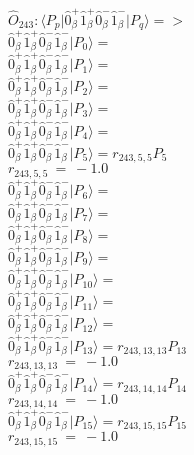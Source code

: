 \documentclass[14pt]{article}
\begin{document}
    $\hat{O}_{243}:  \langle{P_p}\vert \hat{0}_{\beta}^{+}\hat{1}_{\beta}^{+}\hat{0}_{\beta}^{-}\hat{1}_{\beta}^{-} \vert{P_q}\rangle => $ \\ 
    $ \hat{0}_{\beta}^{+}\hat{1}_{\beta}^{+}\hat{0}_{\beta}^{-}\hat{1}_{\beta}^{-} \vert{P_{0}}\rangle =  $ \\ 
    $ \hat{0}_{\beta}^{+}\hat{1}_{\beta}^{+}\hat{0}_{\beta}^{-}\hat{1}_{\beta}^{-} \vert{P_{1}}\rangle =  $ \\ 
    $ \hat{0}_{\beta}^{+}\hat{1}_{\beta}^{+}\hat{0}_{\beta}^{-}\hat{1}_{\beta}^{-} \vert{P_{2}}\rangle =  $ \\ 
    $ \hat{0}_{\beta}^{+}\hat{1}_{\beta}^{+}\hat{0}_{\beta}^{-}\hat{1}_{\beta}^{-} \vert{P_{3}}\rangle =  $ \\ 
    $ \hat{0}_{\beta}^{+}\hat{1}_{\beta}^{+}\hat{0}_{\beta}^{-}\hat{1}_{\beta}^{-} \vert{P_{4}}\rangle =  $ \\ 
    $ \hat{0}_{\beta}^{+}\hat{1}_{\beta}^{+}\hat{0}_{\beta}^{-}\hat{1}_{\beta}^{-} \vert{P_{5}}\rangle = {r}_{243,5,5}P_{5} $ \\ 
    ${r}_{243,5,5}\ =\ -1.0 $ \\ 
    $ \hat{0}_{\beta}^{+}\hat{1}_{\beta}^{+}\hat{0}_{\beta}^{-}\hat{1}_{\beta}^{-} \vert{P_{6}}\rangle =  $ \\ 
    $ \hat{0}_{\beta}^{+}\hat{1}_{\beta}^{+}\hat{0}_{\beta}^{-}\hat{1}_{\beta}^{-} \vert{P_{7}}\rangle =  $ \\ 
    $ \hat{0}_{\beta}^{+}\hat{1}_{\beta}^{+}\hat{0}_{\beta}^{-}\hat{1}_{\beta}^{-} \vert{P_{8}}\rangle =  $ \\ 
    $ \hat{0}_{\beta}^{+}\hat{1}_{\beta}^{+}\hat{0}_{\beta}^{-}\hat{1}_{\beta}^{-} \vert{P_{9}}\rangle =  $ \\ 
    $ \hat{0}_{\beta}^{+}\hat{1}_{\beta}^{+}\hat{0}_{\beta}^{-}\hat{1}_{\beta}^{-} \vert{P_{10}}\rangle =  $ \\ 
    $ \hat{0}_{\beta}^{+}\hat{1}_{\beta}^{+}\hat{0}_{\beta}^{-}\hat{1}_{\beta}^{-} \vert{P_{11}}\rangle =  $ \\ 
    $ \hat{0}_{\beta}^{+}\hat{1}_{\beta}^{+}\hat{0}_{\beta}^{-}\hat{1}_{\beta}^{-} \vert{P_{12}}\rangle =  $ \\ 
    $ \hat{0}_{\beta}^{+}\hat{1}_{\beta}^{+}\hat{0}_{\beta}^{-}\hat{1}_{\beta}^{-} \vert{P_{13}}\rangle = {r}_{243,13,13}P_{13} $ \\ 
    ${r}_{243,13,13}\ =\ -1.0 $ \\ 
    $ \hat{0}_{\beta}^{+}\hat{1}_{\beta}^{+}\hat{0}_{\beta}^{-}\hat{1}_{\beta}^{-} \vert{P_{14}}\rangle = {r}_{243,14,14}P_{14} $ \\ 
    ${r}_{243,14,14}\ =\ -1.0 $ \\ 
    $ \hat{0}_{\beta}^{+}\hat{1}_{\beta}^{+}\hat{0}_{\beta}^{-}\hat{1}_{\beta}^{-} \vert{P_{15}}\rangle = {r}_{243,15,15}P_{15} $ \\ 
    ${r}_{243,15,15}\ =\ -1.0 $ \\ 
    
\end{document}
